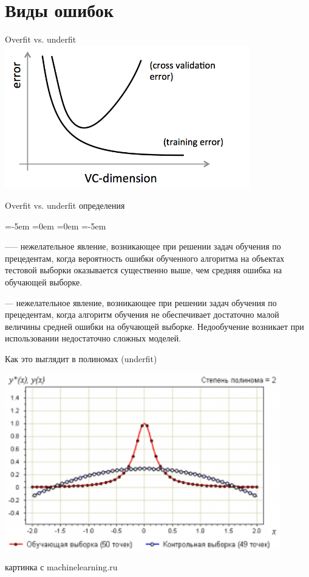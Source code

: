 \documentclass[14pt, fleqn, xcolor={dvipsnames, table}]{beamer}
\begin{document}
\section{Виды ошибок}
\begin{frame}{Overfit vs. underfit}
\centering
\includegraphics[width=0.8\textwidth]{overfit_underfit.png} 
\end{frame}

\begin{frame}{Overfit vs. underfit определения}
\small
\begin{description}
\leftmargin=-5em
\itemindent=0em
=0em
\leftskip=-5em
  \item[Переобучение, переподгонка (overtraining, overfitting)] —-- нежелательное явление, возникающее при решении задач обучения по прецедентам, когда вероятность ошибки обученного алгоритма на объектах тестовой выборки оказывается существенно выше, чем средняя ошибка на обучающей выборке. 
  \item[Недообучение (underfitting)] --- нежелательное явление, возникающее при решении задач обучения по прецедентам, когда алгоритм обучения не обеспечивает достаточно малой величины средней ошибки на обучающей выборке. Недообучение возникает при использовании недостаточно сложных моделей.
\end{description}
\end{frame}

\begin{frame}{Как это выглядит в полиномах (underfit)}
\begin{center}
\includegraphics[width=0.9\textwidth]{300px-LsmRunge2.png}
\end{center}
{\footnotesize картинка с machinelearning.ru}
\end{frame}
\end{document}
